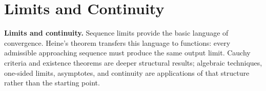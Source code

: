 \chapter{Limits and Continuity}









\noindent\textbf{Limits and continuity.} Sequence limits provide the basic language of convergence. Heine's theorem transfers this language to functions: every admissible approaching sequence must produce the same output limit. Cauchy criteria and existence theorems are deeper structural results; algebraic techniques, one-sided limits, asymptotes, and continuity are applications of that structure rather than the starting point.


